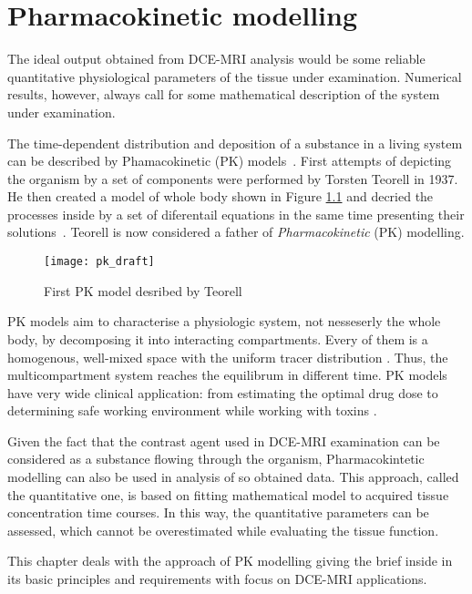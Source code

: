 \chapter{Pharmacokinetic modelling}
\label{chapter:pk}

The ideal output obtained from DCE-MRI analysis would be some reliable quantitative physiological parameters of the tissue under examination. Numerical results, however, always call for some mathematical description of the system under examination. 

The time-dependent distribution and deposition of a substance in a living system can be described by Phamacokinetic (PK) models~\cite{gerlowski1983physiologically}. First attempts of depicting the organism by a set of components were performed by Torsten Teorell in 1937. He then created a model of whole body shown in Figure \ref{fig:pk_draft} and decried the processes inside by a set of diferentail equations in the same time presenting  their solutions~\cite{pkfather}. Teorell is now considered  a father of \textit{Pharmacokinetic} (PK) modelling. 

\begin{figure}[t]
		\centering
		\texttt{[image: pk\_draft]}
		\caption [Teorell first PK model]{First PK model desribed by Teorell \cite{pk_draft}}
		\label{fig:pk_draft}
	\end{figure}

PK models aim to characterise a physiologic system, not nesseserly the whole body, by decomposing it into interacting compartments. Every of them is a homogenous, well-mixed space with the uniform tracer distribution \cite{PMID:20540902}.
Thus, the multicompartment system reaches the equilibrum in different time.  PK models have very wide clinical application: from estimating the optimal drug dose to determining safe working environment while working with toxins  \cite{gerlowski1983physiologically}.

Given the fact that the contrast agent used in DCE-MRI examination can be considered as a substance flowing through the organism, Pharmacokintetic modelling can also be used in analysis of so obtained data.   
This approach, called the quantitative one, is based on fitting mathematical model to acquired tissue concentration time courses. In this way, the quantitative parameters can be assessed, which cannot be overestimated while evaluating the tissue function. 


This chapter deals with the approach of PK modelling giving the brief inside in its basic principles and requirements with focus on DCE-MRI applications. 
\newpage



